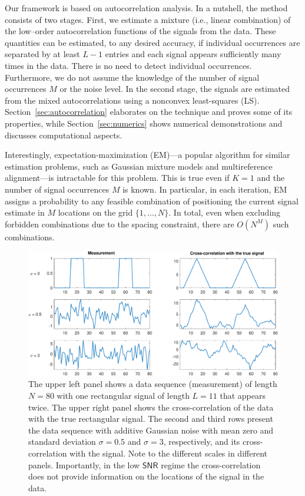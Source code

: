 \documentclass[english,11pt]{article}
\newcommand{\TODO}[1]{{\color{red}{[#1]}}}
\numberwithin{equation}{section}
\theoremstyle{plain}
\theoremstyle{definition}
\theoremstyle{remark}
\theoremstyle{plain}
\theoremstyle{remark}
\theoremstyle{plain}
\theoremstyle{plain}
\newcommand{\SNR}{{\textsf{SNR}}}
\begin{document}
Our framework is based on autocorrelation analysis.
In a nutshell, the method consists of two stages. First, we estimate a mixture (i.e., linear combination) of the low--order autocorrelation functions of the signals from the data. These quantities can be estimated, to any desired accuracy, if individual occurrences are separated by at least $L-1$ entries and  each signal appears sufficiently many times in the data. There is no need to detect individual occurrences. 
Furthermore, we do not assume the knowledge of the number of signal occurrences $M$ or the noise level.
In the second stage, the signals are estimated from the mixed autocorrelations using a nonconvex least-squares (LS).
Section~\ref{sec:autocorrelation} elaborates on the technique and proves some of its properties, while Section~\ref{sec:numerics} shows numerical demonstrations and discusses computational aspects.

Interestingly, expectation-maximization (EM)---a popular algorithm for similar estimation problems, such as Gaussian mixture models and multireference alignment---is intractable for this problem. This is true even if  $K=1$ and the number of signal occurrences $M$ is known.
In particular, in each iteration, EM assigns a probability to any feasible combination of positioning the current signal estimate in $M$ locations on the grid $\{1,\ldots,N\}$.
In total, even when excluding forbidden combinations due to the spacing constraint, there are $O(N^M)$ such combinations. \TODO{cumbersome}


\begin{figure}
		\centering
		\includegraphics[scale=0.5]{XC_example}
		\caption{ The upper left panel shows a data sequence (measurement) of length $N=80$ with one rectangular signal of length $L=11$ that appears twice. The upper right panel shows the cross-correlation of the data with the true rectangular signal.  
		The second and third rows present the data sequence with additive Gaussian noise with mean zero and standard deviation $\sigma=0.5$ and $\sigma=3$, respectively, and its cross-correlation with the signal. Note to the different scales in different panels. Importantly, in the low $\SNR$ regime the cross-correlation does not provide information on the locations of the signal in the data.}
    	\label{fig:XC_example}
\end{figure}
\end{document}
